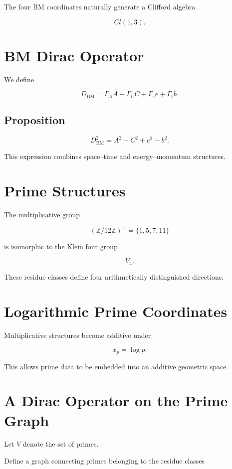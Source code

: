 \documentclass[11pt,a4paper]{article}
\begin{document}
	The four BM coordinates naturally generate
	a Clifford algebra
	
	\[
	Cl(1,3).
	\]
	
	\section{BM Dirac Operator}
	
	We define
	
	\[
	D_{\mathrm{BM}}
	=
	\Gamma_A A+
	\Gamma_C C+
	\Gamma_e e+
	\Gamma_b b .
	\]
	
	\subsection{Proposition}
	
	\[
	D_{\mathrm{BM}}^2
	=
	A^2-C^2+e^2-b^2 .
	\]
	
	This expression combines space–time and
	energy–momentum structures.
	
	\section{Prime Structures}
	
	The multiplicative group
	
	\[
	(\mathbb Z/12\mathbb Z)^\times
	=
	\{1,5,7,11\}
	\]
	
	is isomorphic to the Klein four group
	
	\[
	V_4 .
	\]
	
	These residue classes define four
	arithmetically distinguished directions.
	
	\section{Logarithmic Prime Coordinates}
	
	Multiplicative structures become additive under
	
	\[
	x_p=\log p .
	\]
	
	This allows prime data to be embedded into
	an additive geometric space.
	
	\section{A Dirac Operator on the Prime Graph}
	
	Let $V$ denote the set of primes.
	
	Define a graph connecting primes belonging
	to the residue classes
	
\end{document}
